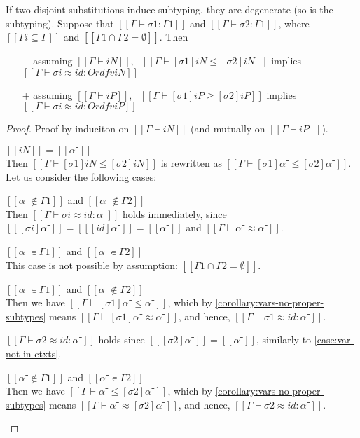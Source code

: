 \begin{lemma}
  \label{lemma:subt-ind-disj-subst}
  If two disjoint substitutions induce subtyping, they are degenerate (so is the
  subtyping).
  Suppose that $[[Γ ⊢ σ1 : Γ1]]$ and $[[Γ ⊢ σ2 : Γ1]]$,
  where $[[{Γi} ⊆ {Γ}]]$ and $[[{Γ1} ∩ {Γ2}= ∅]]$. Then
  \begin{itemize}
  \item[$-$] assuming $[[Γ ⊢ iN]]$,~
    $[[Γ ⊢ [σ1]iN ≤ [σ2]iN]]$ implies $[[Γ ⊢ σi ≈ id : Ord fv iN]]$
  \item[$+$] assuming $[[Γ ⊢ iP]]$,~
    $[[Γ ⊢ [σ1]iP ≥ [σ2]iP]]$ implies $[[Γ ⊢ σi ≈ id : Ord fv iP]]$
  \end{itemize}
\end{lemma}
\begin{proof}
  Proof by induciton on $[[Γ ⊢ iN]]$ (and mutually on $[[Γ ⊢ iP]]$).
  \begin{caseof}
    \item $[[iN]] = [[α⁻]]$\\
      Then $[[Γ ⊢ [σ1]iN ≤ [σ2]iN]]$ is rewritten as $[[Γ ⊢ [σ1]α⁻ ≤ [σ2]α⁻]]$.
      Let us consider the following cases:
      \begin{caseof}
      \item $[[α⁻ ∉ {Γ1}]]$ and $[[α⁻ ∉ {Γ2}]]$ \label{case:var-not-in-ctxts}\\
        Then $[[Γ ⊢ σi ≈ id : α⁻]]$ holds immediately,
        since $[[ [σi] α⁻]] = [[ [id] α⁻]] = [[α⁻]]$ and
        $[[Γ ⊢ α⁻ ≈ α⁻]]$.
      \item $[[α⁻ ∊ {Γ1}]]$ and $[[α⁻ ∊ {Γ2}]]$\\
        This case is not possible by assumption: $[[{Γ1} ∩ {Γ2}= ∅]]$.
      \item $[[α⁻ ∊ {Γ1}]]$ and $[[α⁻ ∉ {Γ2}]]$\\
        Then we have $[[Γ ⊢ [σ1]α⁻ ≤ α⁻]]$,
        which by \cref{corollary:vars-no-proper-subtypes} means $[[Γ ⊢ [σ1]α⁻ ≈ α⁻]]$,
        and hence, $[[Γ ⊢ σ1 ≈ id : α⁻]]$.

        $[[Γ ⊢ σ2 ≈ id : α⁻]]$ holds since $[[ [σ2]α⁻ ]] = [[α⁻]]$,
        similarly to \cref{case:var-not-in-ctxts}.

      \item $[[α⁻ ∉ {Γ1}]]$ and $[[α⁻ ∊ {Γ2}]]$\\
        Then we have $[[Γ ⊢ α⁻ ≤ [σ2]α⁻]]$,
        which by \cref{corollary:vars-no-proper-subtypes} means $[[Γ ⊢ α⁻ ≈ [σ2]α⁻]]$,
        and hence, $[[Γ ⊢ σ2 ≈ id : α⁻]]$.


\end{caseof}
\end{caseof}
\end{proof}
